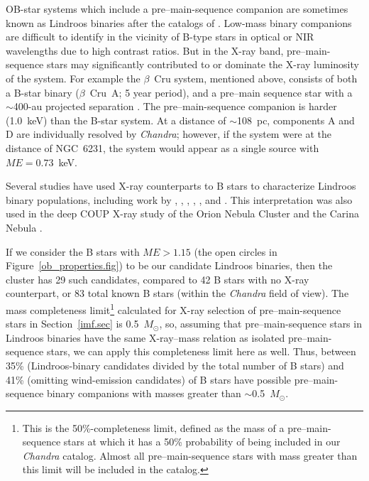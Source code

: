 \documentclass[twocolumn,tighten]{aastex61}
\begin{document}
OB-star systems which include a pre--main-sequence companion are sometimes known as Lindroos binaries after the catalogs of \citet{1985A&AS...60..183L,1986A&A...156..223L}. Low-mass binary companions are difficult to identify in the vicinity of B-type stars in optical or NIR wavelengths due to high contrast ratios. But in the X-ray band, pre--main-sequence stars may significantly contributed to or dominate the X-ray luminosity of the system. For example the $\beta$~Cru system, mentioned above, consists of both a B-star binary ($\beta$~Cru~A; 5 year period), and a pre--main sequence star with a $\sim$400-au projected separation \citep[$\beta$~Cru~D;][]{2008MNRAS.386.1855C}. The pre--main-sequence companion is harder (1.0~keV) than the B-star system. At a distance of $\sim$108~pc, components A and D are individually resolved by {\it Chandra}; however, if the system were at the distance of NGC~6231, the system would appear as a single source with $ME=0.73$~keV. 

Several studies have used X-ray counterparts to B stars to characterize Lindroos binary populations, including work by \citet{1993ApJ...402L..13S}, \citet{1994A&A...292L...5B}, \citet{2000A&A...359..227H,2001A&A...373..657H}, \citet{2003A&A...407.1067S}, \citet{2001A&A...372..152H}, and \citet{2010ApJ...725.2485K}. This interpretation was also used in the deep COUP X-ray study of the Orion Nebula Cluster \citep{2005ApJS..160..557S} and the Carina Nebula \citep{2011ApJS..194....5G,2011ApJS..194....7N,2011ApJS..194...13E}. 

If we consider the B stars with $ME>1.15$ (the open circles in Figure~\ref{ob_properties.fig}) to be our candidate Lindroos binaries, then the cluster has 29 such candidates, compared to 42 B stars with no X-ray counterpart, or 83 total known B stars (within the {\it Chandra} field of view). The mass completeness limit\footnote{This is the 50\%-completeness limit, defined as the mass of a pre--main-sequence stars at which it has a 50\% probability of being included in our {\it Chandra} catalog. Almost all pre--main-sequence stars with mass greater than this limit will be included in the catalog.} calculated for X-ray selection of pre--main-sequence stars in Section~\ref{imf.sec} is 0.5~$M_\odot$, so, assuming that pre--main-sequence stars in Lindroos binaries have the same X-ray--mass relation as isolated pre--main-sequence stars, we can apply this completeness limit here as well. Thus, between 35\% (Lindroos-binary candidates divided by the total number of B stars) and 41\% (omitting wind-emission candidates) of B stars have possible pre--main-sequence binary companions with masses greater than $\sim$0.5~$M_\odot$. 
\end{document}
